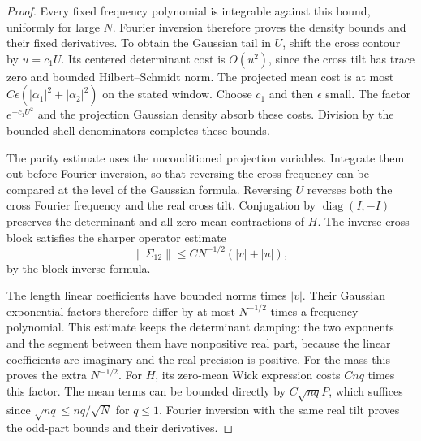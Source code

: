 \begin{proof}
Every fixed frequency
polynomial is integrable against this bound, uniformly for large
$N$. Fourier inversion therefore proves the density bounds and
their fixed derivatives. To obtain the Gaussian tail in $U$, shift
the cross contour by $u=c_1U$. Its centered determinant cost is
$O(u^2)$, since the cross tilt has trace zero and bounded
Hilbert--Schmidt norm. The projected mean cost is at most
$C\epsilon(|\alpha_1|^2+|\alpha_2|^2)$ on the stated window.
Choose $c_1$ and then $\epsilon$ small. The factor $e^{-c_1U^2}$
and the projection Gaussian density absorb these costs. Division
by the bounded shell denominators completes these bounds.

The parity estimate uses the unconditioned projection variables.
Integrate them out before Fourier inversion, so that reversing the
cross frequency can be compared at the level of the Gaussian formula.
Reversing $U$ reverses both the cross Fourier frequency and the
real cross tilt. Conjugation by $\operatorname{diag}(I,-I)$
preserves the determinant and all zero-mean contractions of $H$.
The inverse cross block satisfies the sharper operator estimate
\[
 \|\Sigma_{12}\|\le CN^{-1/2}(|v|+|u|),
\]
by the block inverse formula.

The length linear coefficients have
bounded norms times $|v|$. Their Gaussian exponential factors
therefore differ by at most $N^{-1/2}$ times a frequency polynomial.
This estimate keeps the determinant damping: the two exponents
and the segment between them have nonpositive real part, because
the linear coefficients are imaginary and the real precision is
positive. For the mass this proves the extra $N^{-1/2}$.
For $H$, its zero-mean Wick expression costs $Cnq$ times this
factor. The mean terms can be bounded directly by
$C\sqrt{nq}P$, which suffices since
$\sqrt{nq}\le nq/\sqrt N$ for $q\le1$.
Fourier inversion with the same real tilt proves the odd-part
bounds and their derivatives.
\end{proof}

